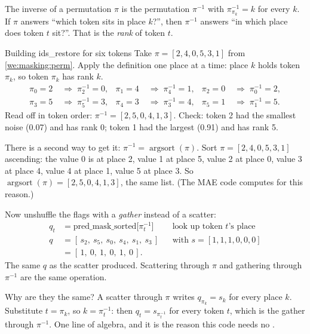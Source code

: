 \begin{definition}
The inverse of a permutation $\pi$ is the permutation $\pi^{-1}$ with $\pi^{-1}_{\pi_k} = k$ for every
$k$. If $\pi$ answers ``which token sits in place $k$?'', then $\pi^{-1}$ answers ``in which place does
token $t$ sit?''. That is the \emph{rank} of token $t$.
\end{definition}

\begin{worked}[label={we:masking:inverse}]{Building ids\_restore for six tokens}
Take $\pi = [2, 4, 0, 5, 3, 1]$ from \cref{we:masking:perm}. Apply the definition one place at a time:
place $k$ holds token $\pi_k$, so token $\pi_k$ has rank $k$.
\begin{align*}
\pi_0 = 2 &\;\Rightarrow\; \pi^{-1}_2 = 0, & \pi_1 = 4 &\;\Rightarrow\; \pi^{-1}_4 = 1, & \pi_2 = 0 &\;\Rightarrow\; \pi^{-1}_0 = 2,\\
\pi_3 = 5 &\;\Rightarrow\; \pi^{-1}_5 = 3, & \pi_4 = 3 &\;\Rightarrow\; \pi^{-1}_3 = 4, & \pi_5 = 1 &\;\Rightarrow\; \pi^{-1}_1 = 5.
\end{align*}
Read off in token order: $\pi^{-1} = [2, 5, 0, 4, 1, 3]$. Check: token 2 had the smallest noise
(0.07) and has rank 0; token 1 had the largest (0.91) and has rank 5.

There is a second way to get it: $\pi^{-1} = \operatorname{argsort}(\pi)$. Sort $\pi = [2,4,0,5,3,1]$
ascending: the value 0 is at place 2, value 1 at place 5, value 2 at place 0, value 3 at place 4, value
4 at place 1, value 5 at place 3. So $\operatorname{argsort}(\pi) = [2, 5, 0, 4, 1, 3]$, the same
list. (The MAE code computes  for this reason.)

Now unshuffle the flags with a \emph{gather} instead of a scatter:
\begin{align*}
q_t &= \text{pred\_mask\_sorted}\big[\pi^{-1}_t\big] && \text{look up token $t$'s place}\\
q &= [\,s_2,\ s_5,\ s_0,\ s_4,\ s_1,\ s_3\,] && \text{with } s = [1,1,1,0,0,0]\\
  &= [\,1,\ 0,\ 1,\ 0,\ 1,\ 0\,] .
\end{align*}
The same $q$ as the scatter produced. Scattering through $\pi$ and gathering through $\pi^{-1}$ are the
same operation.
\end{worked}

Why are they the same? A scatter through $\pi$ writes $q_{\pi_k} = s_k$ for every place $k$. Substitute
$t = \pi_k$, so $k = \pi^{-1}_t$: then $q_t = s_{\pi^{-1}_t}$ for every token $t$, which is the gather
through $\pi^{-1}$. One line of algebra, and it is the reason this code needs no .

